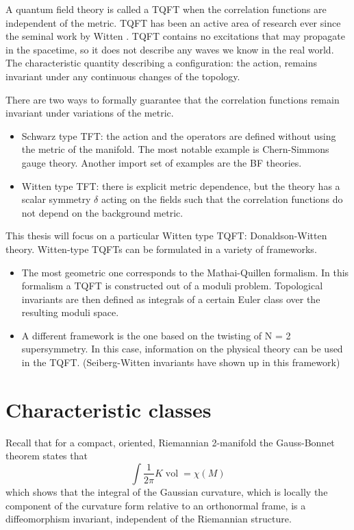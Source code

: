 A quantum field theory is called a TQFT when the correlation functions are
independent of the metric. 
TQFT has been an active area of research ever since the seminal work by Witten
\cite{wittenTQFT}. TQFT contains no excitations that may propagate in the
spacetime, so it does not describe any waves we know in the real world. The
characteristic quantity describing a configuration: the action, remains
invariant under any continuous changes of the topology. 

There are two ways to formally guarantee that the correlation functions remain
invariant under variations of the metric. %
\begin{itemize}
	\item Schwarz type TFT: the action and the operators are defined without 
		using the metric of the manifold. The most notable example is
		Chern-Simmons gauge theory. Another import set of examples are the BF
		theories. 
	\item Witten type TFT: there is explicit metric
	dependence, but the theory has a scalar symmetry $\delta$ acting on
	the fields such that the correlation
	functions do not depend on the background metric. 
\end{itemize}

This thesis will focus on a particular Witten type TQFT: Donaldson-Witten
theory. Witten-type TQFTs can be formulated in a variety of frameworks. 
\begin{itemize}
	\item 
 The most geometric one corresponds to the Mathai-Quillen formalism. In this
formalism a TQFT is constructed out of a moduli problem. Topological invariants
are then defined as integrals of a certain Euler class over the resulting moduli
space.\cite{cernTQFT}
	\item 
 A different framework is the one based on the twisting of N = 2 supersymmetry.
In this case, information on the physical theory can be used in the
TQFT. (Seiberg-Witten invariants have shown up in this framework)
\end{itemize}

\section{Characteristic classes}
Recall that for a compact, oriented, Riemannian 2-manifold the Gauss-Bonnet
theorem states that 
\[
	\int \frac{1}{2\pi} K \operatorname{vol} = \chi(M)
\] 
which shows that the integral of the Gaussian curvature, which is locally the 
component of the curvature form relative to an orthonormal frame, is a
diffeomorphism invariant, independent of the Riemannian structure. 

